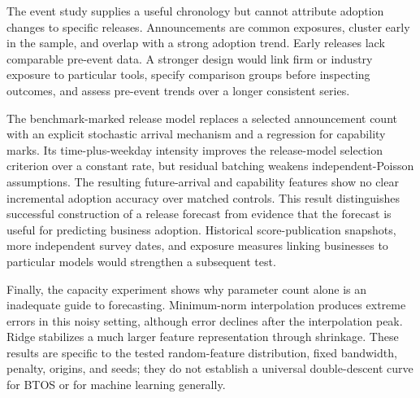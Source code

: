 The event study supplies a useful chronology but cannot attribute adoption changes to specific releases. Announcements are common exposures, cluster early in the sample, and overlap with a strong adoption trend. Early releases lack comparable pre-event data. A stronger design would link firm or industry exposure to particular tools, specify comparison groups before inspecting outcomes, and assess pre-event trends over a longer consistent series.

The benchmark-marked release model replaces a selected announcement count with an explicit stochastic arrival mechanism and a regression for capability marks. Its time-plus-weekday intensity improves the release-model selection criterion over a constant rate, but residual batching weakens independent-Poisson assumptions. The resulting future-arrival and capability features show no clear incremental adoption accuracy over matched controls. This result distinguishes successful construction of a release forecast from evidence that the forecast is useful for predicting business adoption. Historical score-publication snapshots, more independent survey dates, and exposure measures linking businesses to particular models would strengthen a subsequent test.

Finally, the capacity experiment shows why parameter count alone is an inadequate guide to forecasting. Minimum-norm interpolation produces extreme errors in this noisy setting, although error declines after the interpolation peak. Ridge stabilizes a much larger feature representation through shrinkage. These results are specific to the tested random-feature distribution, fixed bandwidth, penalty, origins, and seeds; they do not establish a universal double-descent curve for BTOS or for machine learning generally.
